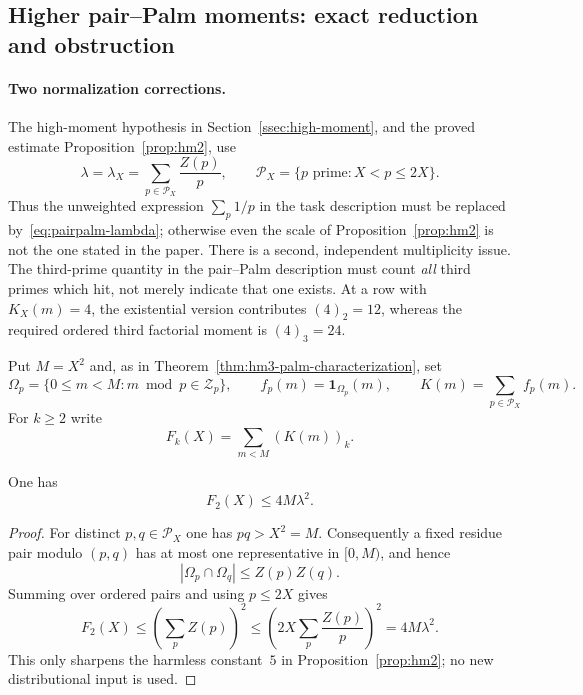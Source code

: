 
\subsection*{Higher pair--Palm moments: exact reduction and obstruction}

\paragraph{Two normalization corrections.}
The high-moment hypothesis in
Section~\ref{ssec:high-moment}, and the proved estimate
Proposition~\ref{prop:hm2}, use
\begin{equation}\label{eq:pairpalm-lambda}
 \lambda=\lambda_X
 =\sum_{p\in\mathcal P_X}\frac{Z(p)}p,
 \qquad
 \mathcal P_X=\{p\text{ prime}:X<p\leq2X\}.
\end{equation}
Thus the unweighted expression $\sum_p1/p$ in the task description
must be replaced by~\eqref{eq:pairpalm-lambda}; otherwise even the
scale of Proposition~\ref{prop:hm2} is not the one stated in the paper.
There is a second, independent multiplicity issue.  The third-prime
quantity in the pair--Palm description must count \emph{all} third
primes which hit, not merely indicate that one exists.  At a row with
$K_X(m)=4$, the existential version contributes $(4)_2=12$, whereas
the required ordered third factorial moment is $(4)_3=24$.

Put $M=X^2$ and, as in Theorem~\ref{thm:hm3-palm-characterization}, set
\[
 \Omega_p=\{0\leq m<M:m\bmod p\in\mathcal Z_p\},
 \qquad f_p(m)=\mathbf1_{\Omega_p}(m),
 \qquad K(m)=\sum_{p\in\mathcal P_X}f_p(m).
\]
For $k\geq2$ write
\[
 F_k(X)=\sum_{m<M}(K(m))_k.
\]

\begin{lemma}
\label{lem:pairpalm-hm2-four}
One has
\begin{equation}\label{eq:pairpalm-hm2-four}
 F_2(X)\leq4M\lambda^2.
\end{equation}
\end{lemma}

\begin{proof}
For distinct $p,q\in\mathcal P_X$ one has $pq>X^2=M$.
Consequently a fixed residue pair modulo $(p,q)$ has at most one
representative in $[0,M)$, and hence
\[
 |\Omega_p\cap\Omega_q|\leq Z(p)Z(q).
\]
Summing over ordered pairs and using $p\leq2X$ gives
\[
 F_2(X)
 \leq\left(\sum_pZ(p)\right)^2
 \leq\left(2X\sum_p\frac{Z(p)}p\right)^2
 =4M\lambda^2.
\]
This only sharpens the harmless constant~$5$ in
Proposition~\ref{prop:hm2}; no new distributional input is used.
\end{proof}

